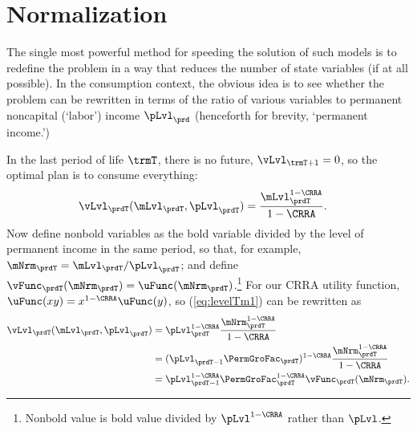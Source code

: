 \documentclass[\econtexRoot/SolvingMicroDSOPs]{subfiles}
\begin{document}
\hypertarget{normalization}{}
\section{Normalization}\label{sec:normalization}

The single most powerful method for speeding the solution of such models is to redefine the problem in a way that reduces the number of state variables (if at all possible).  In the consumption context, the obvious idea is to see whether the problem can be rewritten in terms of the ratio of various variables to permanent noncapital (`labor') income $\pLvl_{\prd}$ (henceforth for brevity, `permanent income.')

In the last {period} of life $\trmT$, there is no future, $\vLvl_{\trmT+1} = 0$, so the optimal plan is to consume everything:
\begin{equation}\begin{gathered}\begin{aligned}
      \vLvl_{\prdT}(\mLvl_{\prdT},\pLvl_{\prdT})  & = \frac{\mLvl_{\prdT}^{1-\CRRA}}{1-\CRRA}. \label{eq:levelTm1}
    \end{aligned}\end{gathered}\end{equation}
Now define nonbold variables as the bold variable divided by the level of permanent income in the same period, so that, for example, $\mNrm_{\prdT}=\mLvl_{\prdT}/\pLvl_{\prdT}$; and define $\vFunc_{\prdT}(\mNrm_{\prdT}) = \uFunc(\mNrm_{\prdT})$.\footnote{Nonbold value is bold value divided by $\pLvl^{1-\CRRA}$ rather than $\pLvl$.}  For our CRRA utility function, $\uFunc(xy)=x^{1-\CRRA}\uFunc(y)$, so (\ref{eq:levelTm1}) can be rewritten as
\begin{equation}\begin{gathered}\begin{aligned}
      \vLvl_{\prdT}(\mLvl_{\prdT},\pLvl_{\prdT}) & = \pLvl_{\prdT}^{1-\CRRA}\frac{{\mNrm}_{\prdT}^{1-\CRRA}}{1-\CRRA}                       \\
                                                & = (\pLvl_{\prdT-1}\PermGroFac_{\prdT})^{1-\CRRA}\frac{{\mNrm}_{\prdT}^{1-\CRRA}}{1-\CRRA} \\
                                                &= \pLvl_{\prdT-1}^{1-\CRRA}\PermGroFac_{\prdT}^{1-\CRRA}\vFunc_{\prdT}(\mNrm_{\prdT}). \label{eq:vT}
    \end{aligned}\end{gathered}\end{equation}
\end{document}

